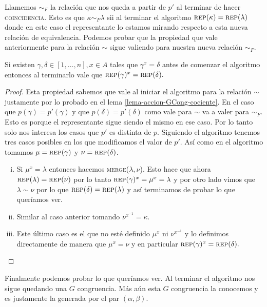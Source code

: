 \documentclass[tesis.tex]{subfiles}
\newcommand{\rep}{\textsc{rep}}
\newcommand{\coin}{\textsc{coincidencia}}
\newcommand{\mer}{\textsc{merge}}
\begin{document}
Llamemos $\sim_F$ la relación que nos queda a partir de $p'$ al terminar de hacer \coin.
Esto es que $\kappa \sim_F \lambda$ sii al terminar el algoritmo $\rep (\kappa) = \rep(\lambda)$ donde en este caso el representante lo estamos mirando respecto a esta nueva relación de equivalencia.
Podemos probar que la propiedad que vale anteriormente para la relación $\sim$ sigue valiendo para nuestra nueva relación $\sim_F$.

\begin{lema}\label{lema-rep-coin}
	Si existen $\gamma, \delta \in [1,\dots,n], x \in A$ tales que $\gamma^x = \delta$ antes de comenzar el algoritmo entonces al terminarlo vale que $\rep(\gamma)^x = \rep(\delta).$
\end{lema}

\begin{proof}
	Esta propiedad sabemos que vale al iniciar el algoritmo para la relación $\sim$ justamente por lo probado en el lema \ref{lema-accion-GCong-cociente}.
	En el caso que $p(\gamma) = p'(\gamma)$ y que $p(\delta) = p'(\delta)$ como vale para $\sim$ va a valer para $\sim_F$.
	Esto es porque el representante sigue siendo el mismo en ese caso.
	Por lo tanto solo nos interesa los casos que $p'$ es distinta de $p$.
	Siguiendo el algoritmo tenemos tres casos posibles en los que modificamos el valor de $p'$.
	Así como en el algoritmo tomamos $\mu = \rep(\gamma)$ y $\nu = \rep(\delta)$.
	\begin{enumerate}[(i).]
		\item Si $\mu^x = \lambda$ entonces hacemos \mer($\lambda, \nu$). 
		Esto hace que ahora $\rep (\lambda) = \rep (\nu)$ por lo tanto $\rep(\gamma)^x = \mu^x = \lambda $ y por otro lado vimos que $\lambda \sim \nu $ por lo que $ \rep(\delta) = \rep (\lambda)$ y así terminamos de probar lo que queríamos ver.
		\item Similar al caso anterior tomando $\nu^{x^{-1}} = \kappa$.
		\item Este último caso es el que no esté definido $\mu^x$ ni $\nu^{x^{-1}}$ y lo definimos directamente de manera que $\mu^x = \nu$ y en particular $\rep(\gamma)^x = \rep(\delta).$
	\end{enumerate}
	
	
\end{proof}


Finalmente podemos probar lo que queríamos ver.
Al terminar el algoritmo nos sigue quedando una $G$ congruencia.
Más aún esta $G$ congruencia la conocemos y es justamente la generada por el par $(\alpha, \beta)$. 
\end{document}
